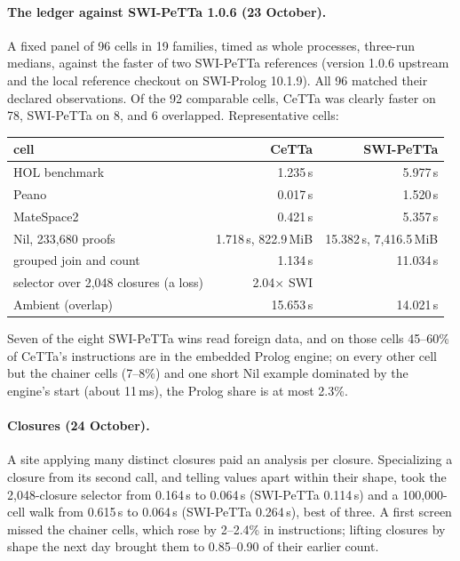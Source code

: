 \documentclass[11pt]{article}
\newcommand{\PeTTa}{\textup{PeTTa}}
\newcommand{\CeTTa}{\textup{CeTTa}}
\begin{document}
\paragraph{The ledger against SWI-\PeTTa{} 1.0.6 (23 October).}  A fixed panel
of 96 cells in 19 families, timed as whole processes, three-run medians,
against the faster of two SWI-\PeTTa{} references (version 1.0.6 upstream and
the local reference checkout on SWI-Prolog 10.1.9).  All 96 matched their
declared observations.  Of the 92 comparable cells, \CeTTa{} was clearly faster
on 78, SWI-\PeTTa{} on 8, and 6 overlapped.  Representative cells:

\begin{center}
\small
\begin{tabular}{@{}lrr@{}}
\toprule
cell & \CeTTa{} & SWI-\PeTTa{} \\
\midrule
HOL benchmark & 1.235\,s & 5.977\,s \\
Peano & 0.017\,s & 1.520\,s \\
MateSpace2 & 0.421\,s & 5.357\,s \\
Nil, 233{,}680 proofs & 1.718\,s, 822.9\,MiB & 15.382\,s, 7{,}416.5\,MiB \\
grouped join and count & 1.134\,s & 11.034\,s \\
selector over 2{,}048 closures (a loss) & 2.04$\times$ SWI & \\
Ambient (overlap) & 15.653\,s & 14.021\,s \\
\bottomrule
\end{tabular}
\end{center}

\noindent
Seven of the eight SWI-\PeTTa{} wins read foreign data, and on those cells
45--60\% of \CeTTa{}'s instructions are in the embedded Prolog engine; on every
other cell but the chainer cells (7--8\%) and one short Nil example dominated
by the engine's start (about 11\,ms), the Prolog share is at most 2.3\%.

\paragraph{Closures (24 October).}  A site applying many distinct closures
paid an analysis per closure.  Specializing a closure from its second call,
and telling values apart within their shape, took the 2{,}048-closure selector
from 0.164\,s to 0.064\,s (SWI-\PeTTa{} 0.114\,s) and a 100{,}000-cell walk
from 0.615\,s to 0.064\,s (SWI-\PeTTa{} 0.264\,s), best of three.  A first
screen missed the chainer cells, which rose by 2--2.4\% in instructions; lifting
closures by shape the next day brought them to 0.85--0.90 of their earlier
count.
\end{document}
